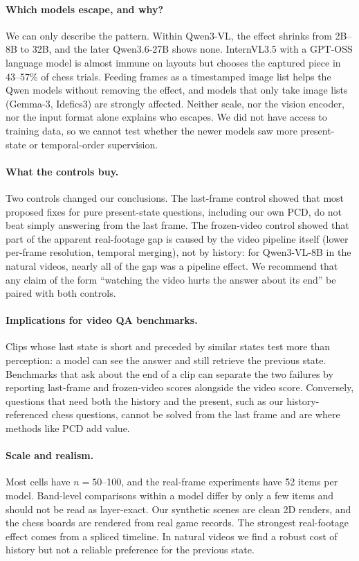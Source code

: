\documentclass[10pt,twocolumn,letterpaper]{article}
\begin{document}
\paragraph{Which models escape, and why?} We can only describe the pattern. Within Qwen3-VL, the effect shrinks from 2B--8B to 32B, and the later Qwen3.6-27B shows none. InternVL3.5 with a GPT-OSS language model is almost immune on layouts but chooses the captured piece in 43--57\% of chess trials. Feeding frames as a timestamped image list helps the Qwen models without removing the effect, and models that only take image lists (Gemma-3, Idefics3) are strongly affected. Neither scale, nor the vision encoder, nor the input format alone explains who escapes. We did not have access to training data, so we cannot test whether the newer models saw more present-state or temporal-order supervision.

\paragraph{What the controls buy.} Two controls changed our conclusions. The last-frame control showed that most proposed fixes for pure present-state questions, including our own PCD, do not beat simply answering from the last frame. The frozen-video control showed that part of the apparent real-footage gap is caused by the video pipeline itself (lower per-frame resolution, temporal merging), not by history: for Qwen3-VL-8B in the natural videos, nearly all of the gap was a pipeline effect. We recommend that any claim of the form ``watching the video hurts the answer about its end'' be paired with both controls.

\paragraph{Implications for video QA benchmarks.} Clips whose last state is short and preceded by similar states test more than perception: a model can see the answer and still retrieve the previous state. Benchmarks that ask about the end of a clip can separate the two failures by reporting last-frame and frozen-video scores alongside the video score. Conversely, questions that need both the history and the present, such as our history-referenced chess questions, cannot be solved from the last frame and are where methods like PCD add value.

\paragraph{Scale and realism.} Most cells have $n=50$--100, and the real-frame experiments have 52 items per model. Band-level comparisons within a model differ by only a few items and should not be read as layer-exact. Our synthetic scenes are clean 2D renders, and the chess boards are rendered from real game records. The strongest real-footage effect comes from a spliced timeline. In natural videos we find a robust cost of history but not a reliable preference for the previous state.
\end{document}
